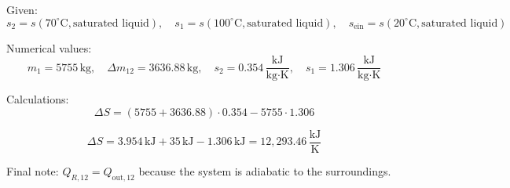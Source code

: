 Given:  
\[
s_2 = s(70^\circ\text{C}, \text{saturated liquid}), \quad s_1 = s(100^\circ\text{C}, \text{saturated liquid}), \quad s_{\text{ein}} = s(20^\circ\text{C}, \text{saturated liquid})
\]  

Numerical values:  
\[
m_1 = 5755 \, \text{kg}, \quad \Delta m_{12} = 3636.88 \, \text{kg}, \quad s_2 = 0.354 \, \frac{\text{kJ}}{\text{kg·K}}, \quad s_1 = 1.306 \, \frac{\text{kJ}}{\text{kg·K}}
\]  

Calculations:  
\[
\Delta S = (5755 + 3636.88) \cdot 0.354 - 5755 \cdot 1.306
\]  

\[
\Delta S = 3.954 \, \text{kJ} + 35 \, \text{kJ} - 1.306 \, \text{kJ} = 12,293.46 \, \frac{\text{kJ}}{\text{K}}
\]  

Final note: \( Q_{R,12} = Q_{\text{out},12} \) because the system is adiabatic to the surroundings.